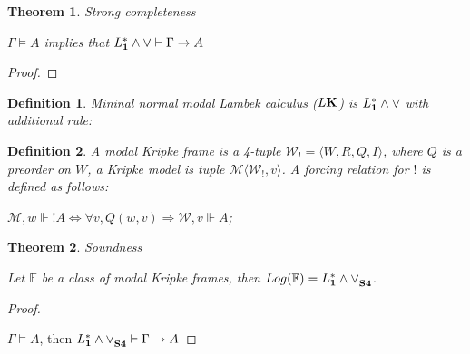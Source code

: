 \documentclass[a4paper]{article}
\theoremstyle{defin}
\newtheorem{defin}{Definition}
\theoremstyle{theorem}
\newtheorem{theorem}{Theorem}
\theoremstyle{prop}
\theoremstyle{lemma}
\theoremstyle{ex}
\theoremstyle{col}
\begin{document}
\begin{theorem} Strong completeness
$ $

  $\Gamma \models A$ implies that $L^{*}_{\bf 1} \land \lor \vdash \Gamma \rightarrow A$
\end{theorem}

\begin{proof}
\end{proof}

\begin{defin}
  Mininal normal modal Lambek calculus ($L{\bf K}$) is $L^{*}_{\bf 1} \land \lor$ with additional rule:

  \begin{prooftree}
  \end{prooftree}
\end{defin}

\begin{defin}
  A modal Kripke frame is a 4-tuple $\mathcal{W}_{!} = \langle W, R, Q, I \rangle$, where $Q$ is a preorder on $W$,
  a Kripke model is tuple $\mathcal{M} \langle \mathcal{W}_{!}, v \rangle$. A forcing relation for $!$ is defined as follows:
  \item $\mathcal{M}, w \Vdash !A \Leftrightarrow \forall v, Q(w, v) \Rightarrow \mathcal{W}, v \Vdash A$;
\end{defin}

\begin{theorem} Soundness
  $ $

  Let $\mathbb{F}$ be a class of modal Kripke frames, then $Log(\mathbb{F}) = {L^{*}_{\bf 1} \land \lor}_{\bf S4}$.
\end{theorem}

\begin{proof}
  $ $

  $\Gamma \models A$, then ${L^{*}_{\bf 1} \land \lor}_{\bf S4} \vdash \Gamma \rightarrow A$
\end{proof}
\end{document}
